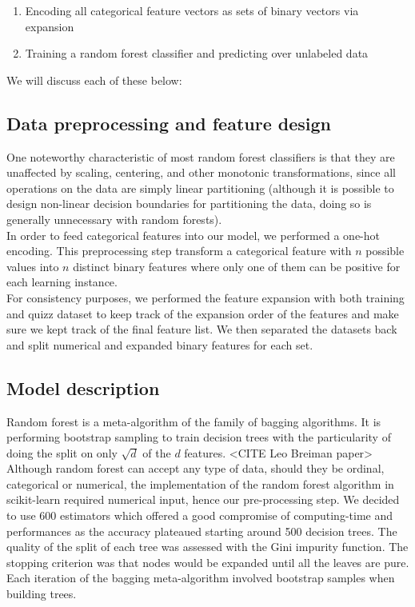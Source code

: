 \documentclass[11pt,a4paper]{article}
\begin{document}
\begin{enumerate}
  \item Encoding all categorical feature vectors as sets of binary vectors via expansion 
  \item Training a random forest classifier and predicting over unlabeled data
\end{enumerate}

We will discuss each of these below:

\subsection{Data preprocessing and feature design}
One noteworthy characteristic of most random forest classifiers is that they are unaffected by scaling, centering, and other monotonic transformations, since all operations on the data are simply linear partitioning (although it is possible to design non-linear decision boundaries for partitioning the data, doing so is generally unnecessary with random forests).\\
In order to feed categorical features into our model, we performed a one-hot encoding. This preprocessing step transform a categorical feature with $n$ possible values into $n$ distinct binary features where only one of them can be positive for each learning instance.\\
For consistency purposes, we performed the feature expansion with both training and quizz dataset to keep track of the expansion order of the features and make sure we kept track of the final feature list. We then separated the datasets back and split numerical and expanded binary features for each set.

\subsection{Model description}

Random forest is a meta-algorithm of the family of bagging algorithms. It is performing bootstrap sampling to train decision trees with the particularity of doing the split on only $\sqrt{d}$ of the $d$ features. <CITE Leo Breiman paper> Although random forest can accept any type of data, should they be ordinal, categorical or numerical, the implementation of the random forest algorithm in scikit-learn required numerical input, hence our pre-processing step. We decided to use 600 estimators which offered a good compromise of computing-time and performances as the accuracy plateaued starting around 500 decision trees. The quality of the split of each tree was assessed with the Gini impurity function. The stopping criterion was that nodes would be expanded until all the leaves are pure. Each iteration of the bagging meta-algorithm involved bootstrap samples when building trees. 
\end{document}
